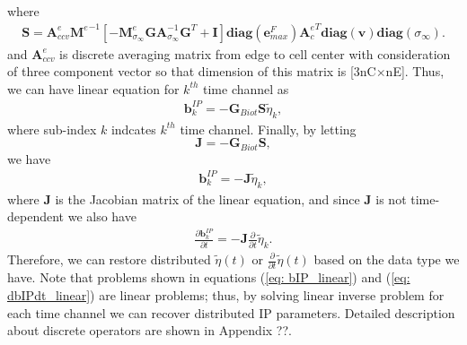 \documentclass[a4paper, 11pt]{article}
\newcommand{\siginf}{\sigma_\infty}
\newcommand{\Ace}{{\mathbf A_c^e}}
\newcommand{\diag}{\mathbf{diag}}
\newcommand{\M}{{\mathbf M}}
\newcommand{\MeSigInf}{{\M^e_{\sigma_\infty}}}
\newcommand{\Me}{{\M^e}}
\newcommand {\db}  { {\mathbf{b} } }
\newcommand {\de}  { {\mathbf{e} } }
\newcommand{\vol}{\mathbf{v}}
\newcommand{\A}{\mathbf{A}}
\newcommand{\Gbiot}{\mathbf{G}_{Biot}}
\newcommand{\peta}{\tilde{\eta}}
\begin{document}
where
\begin{eqnarray}
  \mathbf{S} = \mathbf{A}^{e}_{ccv}\Me^{-1}[-\MeSigInf \mathbf{G} \A_{\siginf}^{-1}\mathbf{G}^T + \mathbf{I}] \diag(\de^{F}_{max})\Ace^T\diag(\vol)\diag(\siginf).
\end{eqnarray}
and $\mathbf{A}^{e}_{ccv}$ is discrete averaging matrix from edge to cell center with consideration of three component vector so that dimension of this matrix is [3nC$\times$nE]. Thus, we can have linear equation for $k^{th}$ time channel as
\begin{eqnarray*}
  \db^{IP}_k = -\Gbiot \mathbf{S} \peta_k,
\end{eqnarray*}
where sub-index $k$ indcates $k^{th}$ time channel. Finally, by letting
\begin{equation}
  \mathbf{J} = -\Gbiot\mathbf{S},
  \label{eq: Sense}
\end{equation}
we have
\begin{eqnarray}
  \db^{IP}_k = -\mathbf{J}\peta_k,
  \label{eq: bIP_linear}
\end{eqnarray}
where $\mathbf{J}$ is the Jacobian matrix of the linear equation, and since $\mathbf{J}$ is not time-dependent we also have
\begin{eqnarray}
  \frac{\partial\db^{IP}_k}{\partial t} = -\mathbf{J}\frac{\partial}{\partial t}\peta_k.
  \label{eq: dbIPdt_linear}
\end{eqnarray}
Therefore, we can restore distributed $\peta(t)$ or $\frac{\partial}{\partial t}\peta(t)$ based on the data type we have. Note that problems shown in equations (\ref{eq: bIP_linear}) and (\ref{eq: dbIPdt_linear}) are linear problems; thus, by solving linear inverse problem for each time channel we can recover distributed IP parameters. Detailed description about discrete operators are shown in Appendix ??.
\end{document}
